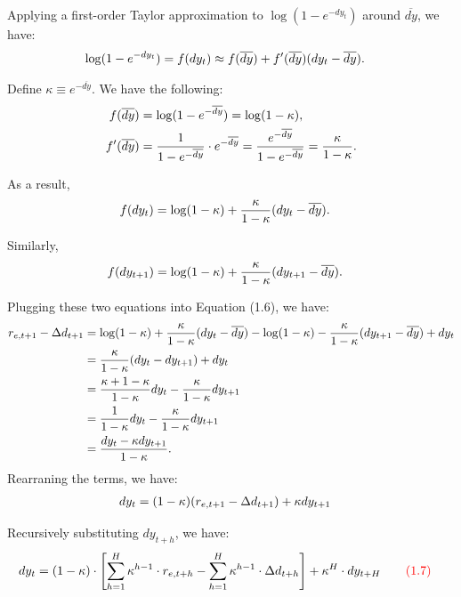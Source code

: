 \documentclass[11pt]{article}
\begin{document}
Applying a first-order Taylor approximation to
$\log(1-e^{-dy_t})$ around $\overline{dy}$, we have:
\begin{align}
    \log(1-e^{-dy_t})
    &= f(dy_t)
    \approx f(\overline{dy})
    + f'(\overline{dy})(dy_t-\overline{dy}).
    \notag
\end{align}

Define $\kappa\equiv e^{-\overline{dy}}$. We have the following:
\begin{align}
    f(\overline{dy})
    &= \log(1-e^{-\overline{dy}})
    = \log(1-\kappa), \notag \\
    f'(\overline{dy})
    &= \frac{1}{1-e^{-\overline{dy}}}
    \cdot e^{-\overline{dy}}
    = \frac{e^{-\overline{dy}}}{1-e^{-\overline{dy}}}
    = \frac{\kappa}{1-\kappa}.
    \notag
\end{align}

As a result,
\begin{align}
    f(dy_t)
    &= \log(1-\kappa)
    + \frac{\kappa}{1-\kappa}(dy_t-\overline{dy}).
    \notag
\end{align}

Similarly,
\begin{align}
    f(dy_{t+1})
    &= \log(1-\kappa)
    + \frac{\kappa}{1-\kappa}(dy_{t+1}-\overline{dy}).
    \notag
\end{align}

Plugging these two equations into Equation {\color{red}(1.6)}, we have:
\begin{align}
    r_{e,t+1}-\Delta d_{t+1}
    &= \log(1-\kappa)
    + \frac{\kappa}{1-\kappa}(dy_t-\overline{dy})
    - \log(1-\kappa)
    - \frac{\kappa}{1-\kappa}(dy_{t+1}-\overline{dy})
    + dy_t \notag \\
    &= \frac{\kappa}{1-\kappa}(dy_t-dy_{t+1})+dy_t
    \notag \\
    &= \frac{\kappa+1-\kappa}{1-\kappa}dy_t
    - \frac{\kappa}{1-\kappa}dy_{t+1} \notag \\
    &= \frac{1}{1-\kappa}dy_t
    - \frac{\kappa}{1-\kappa}dy_{t+1} \notag \\
    &= \frac{dy_t-\kappa dy_{t+1}}{1-\kappa}.
    \notag
\end{align}
Rearraning the terms, we have: 
\begin{align}
    dy_t
    &= (1-\kappa)(r_{e,t+1}-\Delta d_{t+1})
    + \kappa dy_{t+1}
    \notag
\end{align}

Recursively substituting $dy_{t+h}$, we have:
\begin{align}
    dy_t
    &= (1-\kappa)\cdot
    \left[
        \sum_{h=1}^{H}\kappa^{h-1}\cdot r_{e,t+h}
        - \sum_{h=1}^{H}\kappa^{h-1}\cdot\Delta d_{t+h}
    \right]
    + \kappa^H\cdot dy_{t+H}
    \tag*{\color{red}(1.7)}
\end{align}
\end{document}
